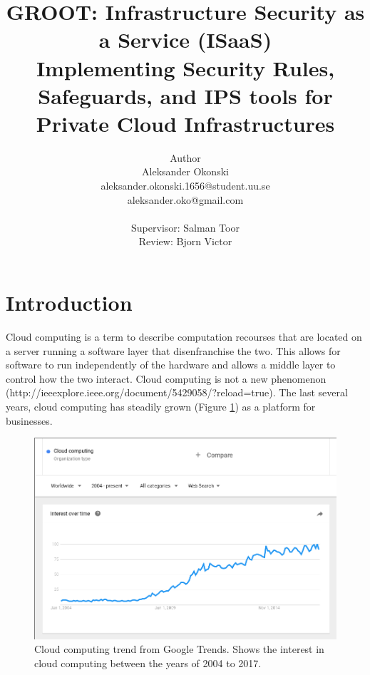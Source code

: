 \documentclass[12pt]{article}
\title{%
    GROOT: Infrastructure Security as a Service (ISaaS)\\
    \large Implementing Security Rules, Safeguards, and IPS tools for Private Cloud Infrastructures}
\author{Author \\
Aleksander Okonski \\
    aleksander.okonski.1656@student.uu.se \\
    aleksander.oko@gmail.com \\
    \vspace{2cm}
    \\
    Supervisor: Salman Toor \\
    Review: Bjorn Victor }
\date{}
\begin{document}
\maketitle
\newpage
\tableofcontents
\newpage

\section{Introduction}
Cloud computing is a term to describe computation recourses that are located on a server running a software layer that disenfranchise the two. This allows for software to run independently of the hardware and allows a middle layer to control how the two interact. Cloud computing is not a new phenomenon (http://ieeexplore.ieee.org/document/5429058/?reload=true). The last several years, cloud computing has steadily grown (Figure \ref{fig:CloudTrendGoogle}) as a platform for businesses.

\begin{figure}[ht]
    \centering
    \includegraphics[scale=.3]{./pic/2017-06-14-130823_923x615_scrot.png}
    \caption{Cloud computing trend from Google Trends. Shows the interest in cloud computing between the years of 2004 to 2017. \cite{GoogleTrendsCloud}}
    \label{fig:CloudTrendGoogle}
\end{figure}
\end{document}
